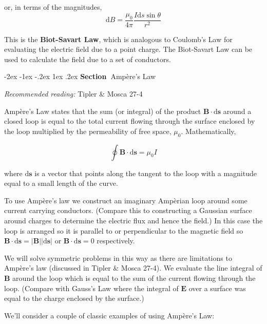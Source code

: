 \documentclass[
]{book}
\makeatletter
\renewcommand\section{%
\@startsection{section}{1}{\z@}%
              {-2ex \@plus -1ex \@minus -.2ex}%
              {1ex \@plus .2ex}%
              {\sffamily\bfseries\large\noindent Section~}}
\numberwithin{equation}{section}
\makeatother
\begin{document}
or, in terms of the magnitudes,
\begin{equation}
\label{eq:magBI}
\mathrm{d} B = \frac{\mu_0}{4\pi}  \frac{I \mathrm{d} s  \sin\theta}{r^2} 
\end{equation}

This is the \textbf{Biot-Savart Law}, which is analogous to Coulomb's Law for
evaluating the electric field due to a point charge. The Biot-Savart Law
can be used to calculate the field due to a set of conductors.  

\hypertarget{ampuxe8res-law}{%
\section{Ampère's Law}\label{ampuxe8res-law}}

\emph{Recommended reading:} Tipler \& Mosca 27-4

Ampère's Law states that the sum (or integral) of the product
\(\mathbf{B} \cdot \mathrm{d}\mathbf{s}\) around a closed loop is equal to the total current
flowing through the surface enclosed by the loop multiplied by the
permeability of free space, \(\mu_0\). Mathematically,

\begin{equation}
\label{eq:BloopIntegral}
\oint \mathbf{B} \cdot \mathrm{d} \mathbf{s} = \mu_0 I
\end{equation}

where \(\mathrm{d}\mathbf{s}\) is a vector that points along the tangent to the loop with
a magnitude equal to a small length of the curve.

To use Ampère's law we construct an imaginary Ampèrian loop around some
current carrying conductors. (Compare this to constructing a Gaussian
surface around charges to determine the electric flux and hence the
field.) In this case the loop is arranged so it is parallel to or
perpendicular to the magnetic field so \(\mathbf{B} \cdot \mathrm{d}\mathbf{s} =|\mathbf{B}||\mathrm{d}\mathbf{s}|\) or
\(\mathbf{B}\cdot \mathrm{d}\mathbf{s} = 0\) respectively.

We will solve symmetric problems in this way as there are limitations to
Ampère's law (discussed in Tipler \& Mosca 27-4). We evaluate the line
integral of \(\mathbf{B}\) around the loop which is equal to the sum of the
current flowing through the loop. (Compare with Gauss's Law where the
integral of \(\mathbf{E}\) over a surface was equal to the charge enclosed by the
surface.)

We'll consider a couple of classic examples of using Ampère's Law:
\end{document}
